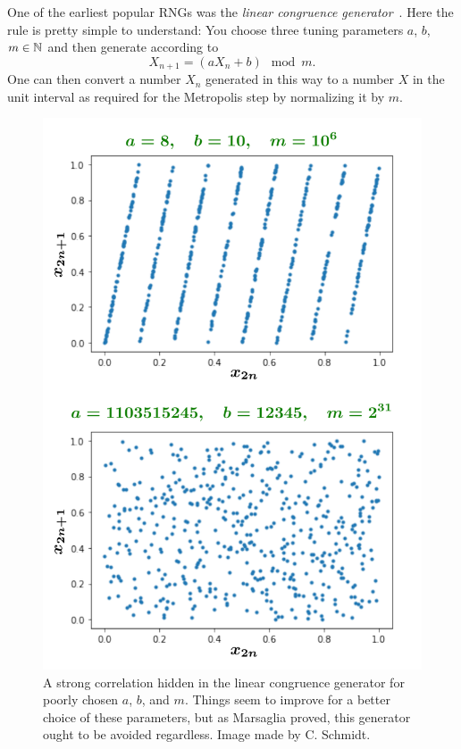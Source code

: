 One of the earliest popular RNGs was the {\it linear congruence
generator}~\cite{lehmer_mathematical_1951,thomson_modified_1958}. 
Here the rule is pretty simple
to understand: You choose three tuning parameters $a$, $b$, $m\in\mathbb{N}$
and then generate according to
\begin{equation}\label{eq:linearCongruence}
X_{n+1}=(aX_n+b)\mod m.
\end{equation}
One can then convert a number $X_n$ generated in this way to a number $X$
in the unit interval as required for the Metropolis step by normalizing it by $m$.


\begin{figure}
\includegraphics[width=\linewidth]{figs/linear_congruence.pdf}
\caption{A strong correlation hidden in the linear congruence generator for
poorly chosen $a$, $b$, and $m$. Things seem to improve for a better choice of
these parameters, but as Marsaglia proved, this generator ought to be avoided
regardless. Image made by C. Schmidt.}
\label{fig:LCG}
\end{figure}

